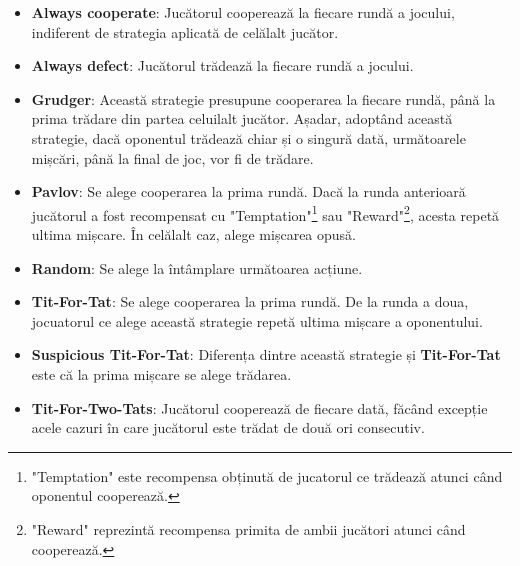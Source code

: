 \begin{itemize}  
	\item \textbf{Always cooperate}: Jucătorul cooperează la fiecare rundă a jocului, indiferent de strategia aplicată de celălalt jucător. 
	\item \textbf{Always defect}: Jucătorul trădează la fiecare rundă a jocului. 
	\item \textbf{Grudger}: Această strategie presupune cooperarea la fiecare rundă, până la prima trădare din partea celuilalt jucător. Așadar, adoptând această strategie, dacă oponentul trădează chiar și o singură dată, următoarele mișcări, până la final de joc, vor fi de trădare. 
	\item \textbf{Pavlov}: Se alege cooperarea la prima rundă. Dacă la runda anterioară jucătorul a fost recompensat cu "Temptation"\footnote{"Temptation" este recompensa obținută de jucatorul ce trădează atunci când oponentul cooperează.} sau "Reward"\footnote{"Reward" reprezintă recompensa primita de ambii jucători atunci când cooperează.}, acesta repetă ultima mișcare. În celălalt caz, alege mișcarea opusă. 
	\item \textbf{Random}: Se alege la întâmplare următoarea acțiune. 
	\item \textbf{Tit-For-Tat}: Se alege cooperarea la prima rundă. De la runda a doua, jocuatorul ce alege această strategie repetă ultima mișcare a oponentului. 
	\item \textbf{Suspicious Tit-For-Tat}: Diferența dintre această strategie și \textbf{Tit-For-Tat} este că la prima mișcare se alege trădarea. 
	\item \textbf{Tit-For-Two-Tats}:  Jucătorul cooperează de fiecare dată, făcând excepție acele cazuri în care jucătorul este trădat de două ori consecutiv. 
\end{itemize}  

